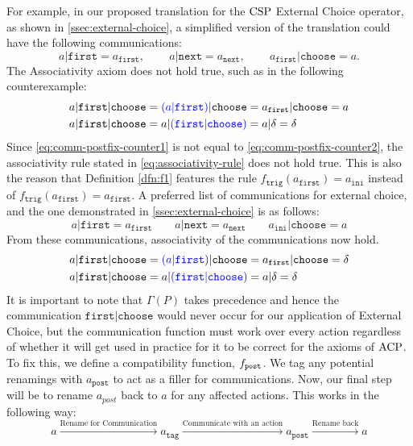 \documentclass[../hons_project.tex]{subfiles}
\begin{document}
For example, in our proposed translation for the $\mathrm{CSP}$ External Choice operator, as shown in \cref{ssec:external-choice}, a simplified version of the translation could have the following communications:
\begin{equation}
	a | \mathtt{first} = a_{\mathtt{first}},\, \qquad a | \mathtt{next} = a_{\mathtt{next}},\, \qquad a_{\mathtt{first}} | \mathtt{choose} = a.
\end{equation}
The Associativity axiom does not hold true, such as in the following counterexample:
\begin{align}
	\label{eq:comm-postfix-counter1}
	a | \mathtt{first} | \mathtt{choose} & = {\color{blue}(a | \mathtt{first})} | \mathtt{choose} = a_{\mathtt{first}} | \mathtt{choose} = a \\
	\label{eq:comm-postfix-counter2}
	a | \mathtt{first} | \mathtt{choose} & = a | {\color{blue}(\mathtt{first} | \mathtt{choose})} = a | \delta = \delta
\end{align}
Since \cref{eq:comm-postfix-counter1} is not equal to \cref{eq:comm-postfix-counter2}, the associativity rule stated in \cref{eq:associativity-rule} does not hold true. This is also the reason that Definition \ref{dfn:f1} features the rule $f_{\mathtt{trig}}(a_{\mathtt{first}}) = a_{\mathtt{ini}}$ instead of $f_{\mathtt{trig}}(a_{\mathtt{first}}) = a_{\mathtt{first}}$.
A preferred list of communications for external choice, and the one demonstrated in \cref{ssec:external-choice} is as follows:
\begin{equation}
	a | \mathtt{first} = a_{\mathtt{first}} \qquad a | \mathtt{next} = a_{\mathtt{next}} \qquad a_{\mathtt{ini}} | \mathtt{choose} = a
\end{equation}
From these communications, associativity of the communications now hold.
\begin{align}
	a | \mathtt{first} | \mathtt{choose} & = {\color{blue}(a | \mathtt{first})} | \mathtt{choose} = a_{\mathtt{first}} | \mathtt{choose} = \delta \\
	a | \mathtt{first} | \mathtt{choose} & = a | {\color{blue}(\mathtt{first} | \mathtt{choose})} = a | \delta = \delta
\end{align}
It is important to note that $\Gamma(P)$ takes precedence and hence the communication $\mathtt{first} | \mathtt{choose}$ would never occur for our application of External Choice, but the communication function must work over every action regardless of whether it will get used in practice for it to be correct for the axioms of $\mathrm{ACP}$. To fix this, we define a compatibility function, $f_{\mathtt{post}}$. We tag any potential renamings with $a_{\mathtt{post}}$ to act as a filler for communications. Now, our final step will be to rename $a_{post}$ back to $a$ for any affected actions. This works in the following way:
\begin{equation}
	a \xrightarrow{\text{Rename for Communication}} a_{\mathtt{tag}} \xrightarrow{\text{Communicate with an action}} a_{\mathtt{post}} \xrightarrow{\text{Rename back}} a
\end{equation}
\end{document}
